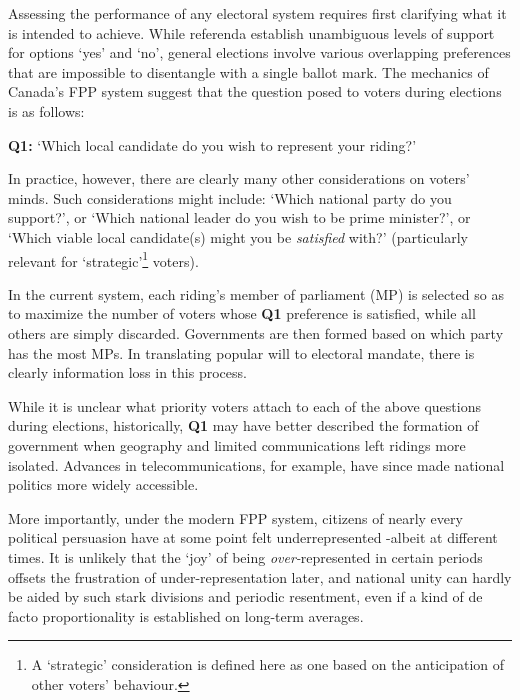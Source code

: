 Assessing the performance of any electoral system requires first clarifying what it is intended to achieve.
While referenda establish unambiguous levels of support for options `yes' and `no', general elections involve various overlapping preferences that are impossible to disentangle with a single ballot mark.
The mechanics of Canada's FPP system suggest that the question posed to voters during elections is as follows:
\begin{tcolorbox}[colback=white!5!white,colframe=blue!55!black]
{\textbf{Q1:} } `Which local candidate do you wish to represent your riding?'
\end{tcolorbox}
In practice, however, there are clearly many other considerations on voters' minds.
Such considerations might include: `Which national party do you support?', or `Which national leader do you wish to be prime minister?', or `Which viable local candidate(s) might you be \emph{satisfied} with?' (particularly relevant for `strategic'\footnote{A `strategic'  consideration is defined here as one based on the anticipation of other voters' behaviour.} voters).

In the current system, each riding's member of parliament (MP) is selected so as to maximize the number of voters whose {\textbf{Q1}} preference is satisfied, while all others are simply discarded. Governments are then formed based on which party has the most MPs.
In translating popular will to electoral mandate, there is clearly information loss in this process.

While it is unclear what priority voters attach to each of the above questions during elections, historically, \textbf{Q1} may have better described the formation of government when geography and limited communications left ridings more isolated.
Advances in telecommunications, for example, have since made national politics more widely accessible.

%


More importantly, under the modern FPP system, citizens of nearly every political persuasion have at some point felt underrepresented \--albeit at different times. It is unlikely that the `joy' of being \emph{over-}represented in certain periods offsets the frustration of under-representation later, and
 national unity can hardly be aided by such stark divisions and periodic resentment, even if a kind of de facto proportionality is established on long-term averages.

